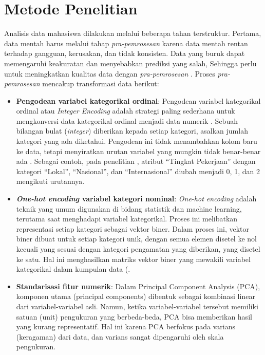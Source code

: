 \section{Metode Penelitian}
Analisis data mahasiswa dilakukan melalui beberapa tahan terstruktur. Pertama, data mentah harus melalui tahap \textit{pra-pemrosesan} karena data mentah rentan terhadap gangguan, kerusakan, dan tidak konsisten. Data yang buruk dapat memengaruhi keakuratan dan menyebabkan prediksi yang salah, Sehingga perlu untuk meningkatkan kualitas data dengan \textit{pra-pemrosesan} \textcite{Maharana2022}. Proses \textit{pra-pemrosesan} mencakup transformasi data berikut:

\begin{itemize}
    \item \textbf{Pengodean variabel kategorikal ordinal}: Pengodean variabel kategorikal ordinal atau \textit{Integer Encoding} adalah strategi paling sederhana untuk mengkonversi data kategorikal ordinal menjadi data numerik \textcite{Pargent2022}. Sebuah bilangan bulat (\textit{integer}) diberikan kepada setiap kategori, asalkan jumlah kategori yang ada diketahui. Pengodean ini tidak menambahkan kolom baru ke data, tetapi menyiratkan urutan variabel yang mungkin tidak benar-benar ada \textcite{Potdar2017}. Sebagai contoh, pada penelitian \textcite{Prasetyawan2025}, atribut “Tingkat Pekerjaan” dengan kategori “Lokal”, “Nasional”, dan “Internasional” diubah menjadi 0, 1, dan 2 mengikuti urutannya.
    \item \textbf{\textit{One-hot encoding} variabel kategori nominal}: \textit{One-hot encoding} adalah teknik yang umum digunakan di bidang statistik dan machine learning, terutama saat menghadapi variabel kategorikal. Proses ini melibatkan representasi setiap kategori sebagai vektor biner. Dalam proses ini, vektor biner dibuat untuk setiap kategori unik, dengan semua elemen disetel ke nol kecuali yang sesuai dengan kategori pengamatan yang diberikan, yang disetel ke satu. Hal ini menghasilkan matriks vektor biner yang mewakili variabel kategorikal dalam kumpulan data (\cite{JIS2024}.
    \item \textbf{Standarisasi fitur numerik}: Dalam Principal Component Analysis (PCA), komponen utama (principal components) dibentuk sebagai kombinasi linear dari variabel-variabel asli. Namun, ketika variabel-variabel tersebut memiliki satuan (unit) pengukuran yang berbeda-beda, PCA bisa memberikan hasil yang kurang representatif. Hal ini karena PCA berfokus pada varians (keragaman) dari data, dan varians sangat dipengaruhi oleh skala pengukuran\textcite{Jolliffe2016}.


\end{itemize}
